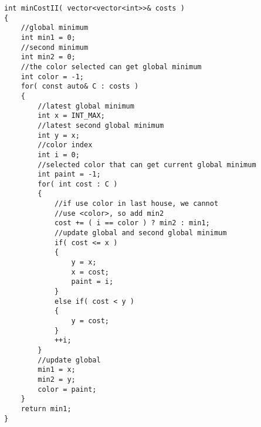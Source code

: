 \setcounter{lstlisting}{0}
\begin{lstlisting}[style=customc, caption={Dynamic Programming}]
int minCostII( vector<vector<int>>& costs )
{
    //global minimum
    int min1 = 0;
    //second minimum
    int min2 = 0;
    //the color selected can get global minimum
    int color = -1;
    for( const auto& C : costs )
    {
        //latest global minimum
        int x = INT_MAX;
        //latest second global minimum
        int y = x;
        //color index
        int i = 0;
        //selected color that can get current global minimum
        int paint = -1;
        for( int cost : C )
        {
            //if use color in last house, we cannot
            //use <color>, so add min2
            cost += ( i == color ) ? min2 : min1;
            //update global and second global minimum
            if( cost <= x )
            {
                y = x;
                x = cost;
                paint = i;
            }
            else if( cost < y )
            {
                y = cost;
            }
            ++i;
        }
        //update global
        min1 = x;
        min2 = y;
        color = paint;
    }
    return min1;
}
\end{lstlisting}